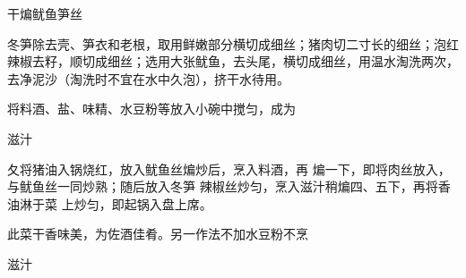 \begin{recipe}{干煸鱿鱼笋丝}

\ingredients


\cooking

\step 冬笋除去壳、笋衣和老根，取用鲜嫩部分横切成细丝；猪肉切二寸长的细丝；泡红辣椒去籽，顺切成细丝；选用大张鱿鱼，去头尾，横切成细丝，用温水淘洗两次，去净泥沙（淘洗时不宜在水中久泡），挤干水待用。

\step 将料酒、盐、味精、水豆粉等放入小碗中搅匀，成为

滋汁

夂将猪油入锅烧红，放入鱿鱼丝煸炒后，烹入料酒，再 煸一下，即将肉丝放入，与鱿鱼丝一同炒熟；随后放入冬笋 辣椒丝炒匀，烹入滋汁稍煸四、五下，再将香油淋于菜 上炒匀，即起锅入盘上席。

\notes

此菜干香味美，为佐酒佳肴。另一作法不加水豆粉不烹

滋汁

\end{recipe}

